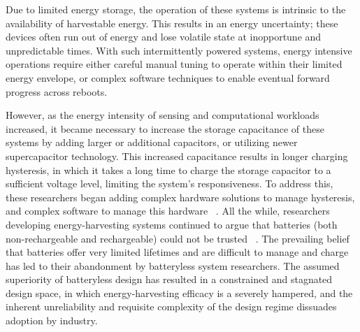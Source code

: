 Due to limited energy storage, the operation of these systems is intrinsic to the availability of harvestable energy. This results in an energy uncertainty; these devices often run out of energy and lose volatile state at inopportune and unpredictable times. With such intermittently powered systems, energy intensive operations require either careful manual tuning to operate within their limited energy envelope, or complex software techniques to enable eventual forward progress across reboots. 

However, as the energy intensity of sensing and computational workloads increased, it became necessary to increase the storage capacitance of these systems by adding larger or additional capacitors, or utilizing newer supercapacitor technology. 
This increased capacitance results in longer charging hysteresis, in which it takes a long time to charge the storage capacitor to a sufficient voltage level, limiting the system's responsiveness.
To address this,
these researchers began adding complex hardware solutions to manage hysteresis, and complex software to manage this hardware 
~\cite{colinReconfigurable18,hesterFlicker17}.
All the while, researchers developing energy-harvesting systems continued to argue that batteries (both non-rechargeable and rechargeable) could not be trusted
~\cite{hesterNew17, hesterTragedy15, hesterFlicker17, hesterTimely17, hester2017future, colinReconfigurable18, luciaIntermittent17, yervaGrafting12, majid2020continuous}.
The prevailing belief that batteries offer very limited lifetimes and are difficult to manage and charge has led to their abandonment by batteryless system researchers. 
The assumed superiority of batteryless design has resulted in a constrained and stagnated design space, in which energy-harvesting efficacy is a severely hampered, and the inherent unreliability and requisite complexity of the design regime dissuades adoption by industry.

